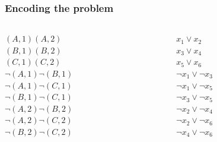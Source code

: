 \documentclass{beamer}
\begin{document}
\begin{frame}
\frametitle{Encoding the problem}
\begin{columns}
	\begin{column}{0.1\textwidth}
		\small
		$(A,1) (A,2) $\\
		$(B,1) (B,2) $\\
		$(C,1) (C,2) $\\
		\vspace{1em}
		$ \neg (A,1)  \neg (B,1)$\\
		$ \neg (A,1)  \neg (C,1)$\\
		$ \neg (B,1)  \neg (C,1)$\\
		\vspace{1em}
		$ \neg (A,2)  \neg (B,2)$\\
		$ \neg (A,2)  \neg (C,2)$\\
		$ \neg (B,2)  \neg (C,2)$\\
	\end{column}
	\begin{column}{0.2\textwidth}  %
		\small
		$ x_1 \lor  x_2 $ \\
		$x_3 \lor  x_4  $ \\
		$x_5 \lor  x_6 $ \\
		\vspace{1em}
		$ \neg x_1 \lor  \neg x_3 $ \\
		$ \neg x_1 \lor  \neg x_5 $ \\
		$ \neg x_3 \lor  \neg x_5 $ \\
		\vspace{1em}
		$\neg x_2 \lor  \neg x_4 $ \\
		$ \neg x_2 \lor  \neg x_6 $ \\
		$ \neg x_4 \lor  \neg x_6 $ \\
	\end{column}
\end{columns}


\end{frame}
\end{document}

